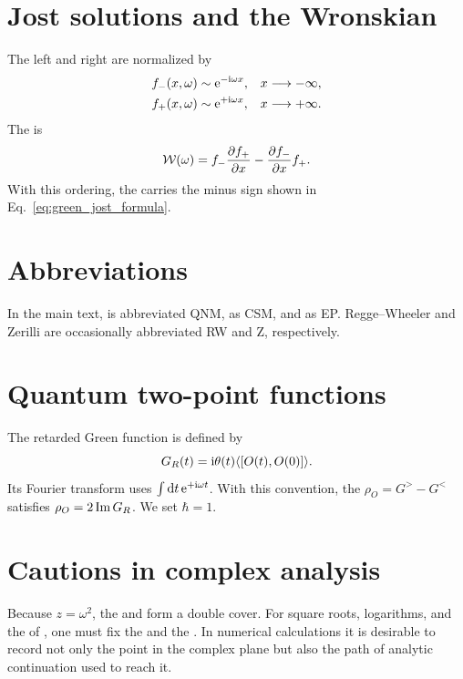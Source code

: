 \section{Jost solutions and the Wronskian}

The left and right  are normalized by
\begin{align}
f_-(x,\omega)
&\sim
\mathrm{e}^{-\mathrm{i}\omega x},
&&x\longrightarrow-\infty,
\\
f_+(x,\omega)
&\sim
\mathrm{e}^{+\mathrm{i}\omega x},
&&x\longrightarrow+\infty.
\end{align}
The  is
\begin{equation}
\mathcal{W}(\omega)
=
f_-\frac{\partial f_+}{\partial x}
-
\frac{\partial f_-}{\partial x}f_+.
\end{equation}
With this ordering, the  carries the minus sign shown in Eq.~\eqref{eq:green_jost_formula}.

\section{Abbreviations}

In the main text,  is abbreviated QNM,  as CSM, and  as EP. Regge--Wheeler and Zerilli are occasionally abbreviated RW and Z, respectively.

\section{Quantum two-point functions}

The retarded Green function is defined by
\begin{equation}
G_R(t)
=
\mathrm{i}\theta(t)\langle[O(t),O(0)]\rangle.
\end{equation}
Its Fourier transform uses $\int\mathrm{d} t\,\mathrm{e}^{+\mathrm{i}\omega t}$. With this convention, the  $\rho_O=G^>-G^<$ satisfies $\rho_O=2\operatorname{Im} G_R$. We set $\hbar=1$.

\section{Cautions in complex analysis}

Because $z=\omega^2$, the  and  form a double cover. For square roots, logarithms, and the  of , one must fix the  and the . In numerical calculations it is desirable to record not only the point in the complex plane but also the path of analytic continuation used to reach it.

